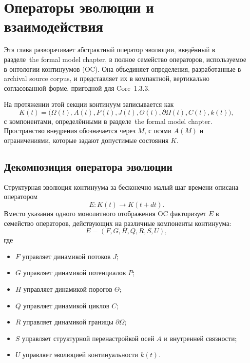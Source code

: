 
\section{Операторы эволюции и взаимодействия}
\label{sec:operators-full}

Эта глава разворачивает абстрактный оператор эволюции, введённый в
разделе~the formal model chapter, в полное семейство операторов, используемое в
онтологии континуумов (OC). Она объединяет определения, разработанные в
archival source corpus, и представляет их в компактной, вертикально согласованной форме,
пригодной для Core~1.3.3.

На протяжении этой секции континуум записывается как
\[
  K(t) =
  \big(
    \Omega(t), A(t), P(t), J(t),
    \Theta(t), \partial\Omega(t), C(t), k(t)
  \big),
\]
с компонентами, определёнными в разделе~the formal model chapter. Пространство
внедрения обозначается через \(M\), с осями \(A(M)\) и ограничениями,
которые задают допустимые состояния \(K\).

\subsection{Декомпозиция оператора эволюции}

Структурная эволюция континуума за бесконечно малый шаг времени
описана оператором
\[
  E : K(t) \longrightarrow K(t+dt).
\]
Вместо указания одного монолитного отображения OC факторизует \(E\) в семейство
операторов, действующих на различные компоненты континуума:
\[
  E = (F, G, H, Q, R, S, U),
\]
где
\begin{itemize}
  \item \(F\) управляет динамикой потоков \(J\);
  \item \(G\) управляет динамикой потенциалов \(P\);
  \item \(H\) управляет динамикой порогов \(\Theta\);
  \item \(Q\) управляет динамикой циклов \(C\);
  \item \(R\) управляет динамикой границы \(\partial\Omega\);
  \item \(S\) управляет структурной перенастройкой осей \(A\) и внутренней
        связности;
  \item \(U\) управляет эволюцией континуальности \(k(t)\).
\end{itemize}

